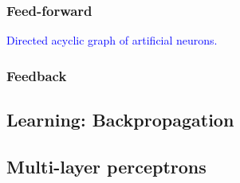 \subsubsection{Feed-forward}

\textcolor{blue}{Directed acyclic graph of artificial neurons.}

\subsubsection{Feedback}

\subsection{Learning: Backpropagation}

\subsection{Multi-layer perceptrons}